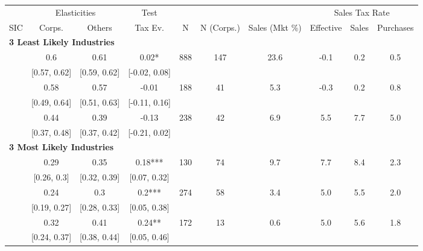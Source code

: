\documentclass[
  12pt]{article}
\theoremstyle{definition}
\theoremstyle{remark}
\begin{document}
\begin{table}
{\centering
\begin{tabular}[t]{c|c|c|c|c|c|c|c|c|c}
\hline
\multicolumn{1}{c|}{ } & \multicolumn{2}{c|}{Elasticities} & \multicolumn{1}{c|}{Test} & \multicolumn{3}{c|}{ } & \multicolumn{3}{c}{Sales Tax Rate} \\
\cline{2-3} \cline{4-4} \cline{8-10}
SIC & Corps. & Others & Tax Ev. & N & N (Corps.) & Sales (Mkt \%) & Effective & Sales & Purchases\\
\hline
\multicolumn{10}{l}{\textbf{3 Least Likely Industries}}\\
\hline
\hspace{1em} & 0.6 & 0.61 & 0.02* & 888 & 147 & 23.6 & -0.1 & 0.2 & 0.5\\
\cline{2-10}
\hspace{1em}\multirow[t]{-2}{*}{\centering\arraybackslash 311} & [0.57, 0.62] & [0.59, 0.62] & [-0.02, 0.08] &  &  &  &  &  & \\
\cline{1-10}
\hspace{1em} & 0.58 & 0.57 & -0.01 & 188 & 41 & 5.3 & -0.3 & 0.2 & 0.8\\
\cline{2-10}
\hspace{1em}\multirow[t]{-2}{*}{\centering\arraybackslash 312} & [0.49, 0.64] & [0.51, 0.63] & [-0.11, 0.16] &  &  &  &  &  & \\
\cline{1-10}
\hspace{1em} & 0.44 & 0.39 & -0.13 & 238 & 42 & 6.9 & 5.5 & 7.7 & 5.0\\
\cline{2-10}
\hspace{1em}\multirow[t]{-2}{*}{\centering\arraybackslash 384} & [0.37, 0.48] & [0.37, 0.42] & [-0.21, 0.02] &  &  &  &  &  & \\
\cline{1-10}
\multicolumn{10}{l}{\textbf{3 Most Likely Industries}}\\
\hline
\hspace{1em} & 0.29 & 0.35 & 0.18*** & 130 & 74 & 9.7 & 7.7 & 8.4 & 2.3\\
\cline{2-10}
\hspace{1em}\multirow[t]{-2}{*}{\centering\arraybackslash 313} & [0.26, 0.3] & [0.32, 0.39] & [0.07, 0.32] &  &  &  &  &  & \\
\cline{1-10}
\hspace{1em} & 0.24 & 0.3 & 0.2*** & 274 & 58 & 3.4 & 5.0 & 5.5 & 2.0\\
\cline{2-10}
\hspace{1em}\multirow[t]{-2}{*}{\centering\arraybackslash 369} & [0.19, 0.27] & [0.28, 0.33] & [0.05, 0.38] &  &  &  &  &  & \\
\cline{1-10}
\hspace{1em} & 0.32 & 0.41 & 0.24** & 172 & 13 & 0.6 & 5.0 & 5.6 & 1.8\\
\cline{2-10}
\hspace{1em}\multirow[t]{-2}{*}{\centering\arraybackslash 331} & [0.24, 0.37] & [0.38, 0.44] & [0.05, 0.46] &  &  &  &  &  & \\
\hline
\end{tabular}

}

\end{table}%
\end{document}
